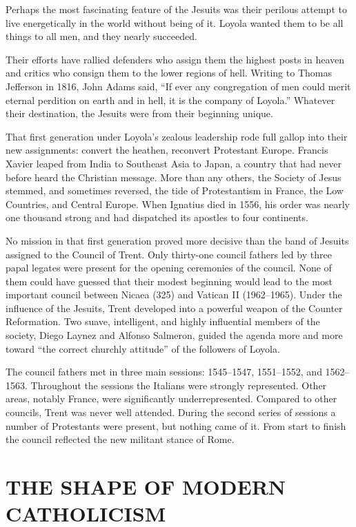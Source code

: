 Perhaps the most fascinating feature of the Jesuits was their perilous attempt to live energetically
in the world without being of it. Loyola wanted them to be all things to all men, and they nearly
succeeded.

Their efforts have rallied defenders who assign them the highest posts in heaven and critics who
consign them to the lower regions of hell. Writing to Thomas Jefferson in 1816, John Adams said, “If
ever any congregation of men could merit eternal perdition on earth and in hell, it is the company
of Loyola.” Whatever their destination, the Jesuits were from their beginning unique.

That first generation under Loyola’s zealous leadership rode full gallop into their new assignments:
convert the heathen, reconvert Protestant Europe. Francis Xavier leaped from India to Southeast Asia
to Japan, a country that had never before heard the Christian message. More than any others, the
Society of Jesus stemmed, and sometimes reversed, the tide of Protestantism in France, the Low
Countries, and Central Europe. When Ignatius died in 1556, his order was nearly one thousand strong
and had dispatched its apostles to four continents.

No mission in that first generation proved more decisive than the band of Jesuits assigned to the
Council of Trent. Only thirty-one council fathers led by three papal legates were present for the
opening ceremonies of the council. None of them could have guessed that their modest beginning would
lead to the most important council between Nicaea (325) and Vatican II (1962–1965). Under the
influence of the Jesuits, Trent developed into a powerful weapon of the Counter Reformation. Two
suave, intelligent, and highly influential members of the society, Diego Laynez and Alfonso
Salmeron, guided the agenda more and more toward “the correct churchly attitude” of the followers of
Loyola.

The council fathers met in three main sessions: 1545–1547, 1551–1552, and 1562–1563. Throughout the
sessions the Italians were strongly represented. Other areas, notably France, were significantly
underrepresented. Compared to other councils, Trent was never well attended. During the second
series of sessions a number of Protestants were present, but nothing came of it. From start to
finish the council reflected the new militant stance of Rome.

\section{THE SHAPE OF MODERN CATHOLICISM}

